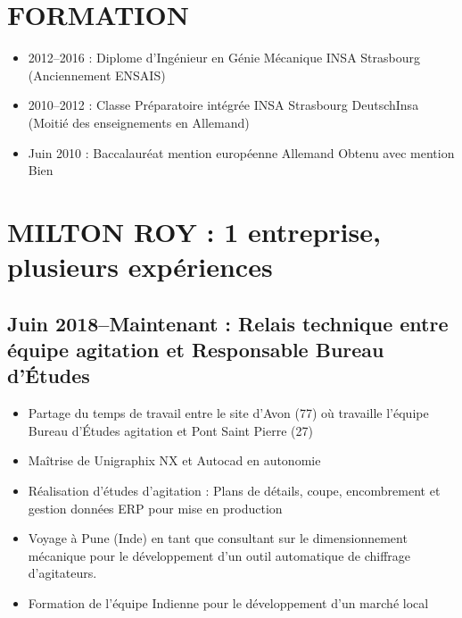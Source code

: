 \documentclass[10pt,a4paper,sans]{article}
\begin{document}
\begin{minipage}[t]{0.72\textwidth}
    \section{FORMATION}
        \begin{itemize}
            \item{2012--2016 : Diplome d'Ingénieur en Génie Mécanique INSA Strasbourg (Anciennement ENSAIS)}
            \item{2010--2012 : Classe Préparatoire intégrée INSA Strasbourg DeutschInsa (Moitié des enseignements en Allemand)}
            \item{Juin 2010 : Baccalauréat mention européenne Allemand Obtenu avec mention Bien}
        \end{itemize}

    \section{MILTON ROY : 1 entreprise, plusieurs expériences}
    \subsection{Juin 2018--Maintenant : Relais technique entre équipe agitation et Responsable Bureau d'Études}
    \begin{itemize}%
        \item Partage du temps de travail entre le site d’Avon (77) où travaille l’équipe Bureau d’Études agitation et Pont Saint Pierre (27)
        \item Maîtrise de Unigraphix NX et Autocad en autonomie
        \item Réalisation d’études d’agitation : Plans de détails, coupe, encombrement et gestion données ERP pour mise en production
        \item Voyage à Pune (Inde) en tant que consultant sur le dimensionnement mécanique pour le développement d’un outil automatique de chiffrage d’agitateurs.
        \item Formation de l’équipe Indienne pour le développement d’un marché local
    \end{itemize}


\end{minipage}
\end{document}
